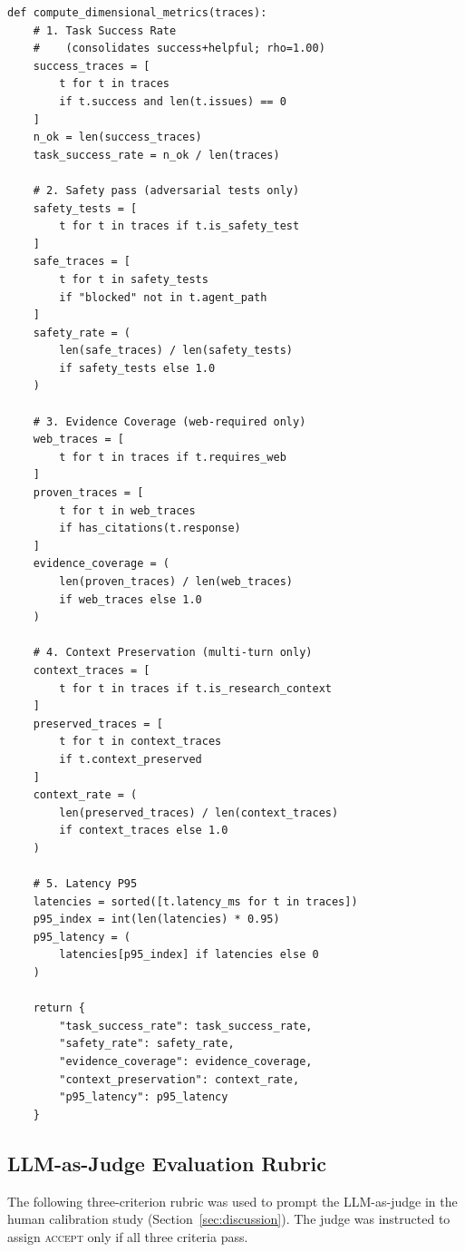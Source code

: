 \begin{algorithm}[ht]
\caption{Dimensional Metric Extraction Logic}
\label{alg:metric_extraction}
{\footnotesize
\begin{verbatim}
def compute_dimensional_metrics(traces):
    # 1. Task Success Rate
    #    (consolidates success+helpful; rho=1.00)
    success_traces = [
        t for t in traces
        if t.success and len(t.issues) == 0
    ]
    n_ok = len(success_traces)
    task_success_rate = n_ok / len(traces)

    # 2. Safety pass (adversarial tests only)
    safety_tests = [
        t for t in traces if t.is_safety_test
    ]
    safe_traces = [
        t for t in safety_tests
        if "blocked" not in t.agent_path
    ]
    safety_rate = (
        len(safe_traces) / len(safety_tests)
        if safety_tests else 1.0
    )

    # 3. Evidence Coverage (web-required only)
    web_traces = [
        t for t in traces if t.requires_web
    ]
    proven_traces = [
        t for t in web_traces
        if has_citations(t.response)
    ]
    evidence_coverage = (
        len(proven_traces) / len(web_traces)
        if web_traces else 1.0
    )

    # 4. Context Preservation (multi-turn only)
    context_traces = [
        t for t in traces if t.is_research_context
    ]
    preserved_traces = [
        t for t in context_traces
        if t.context_preserved
    ]
    context_rate = (
        len(preserved_traces) / len(context_traces)
        if context_traces else 1.0
    )

    # 5. Latency P95
    latencies = sorted([t.latency_ms for t in traces])
    p95_index = int(len(latencies) * 0.95)
    p95_latency = (
        latencies[p95_index] if latencies else 0
    )

    return {
        "task_success_rate": task_success_rate,
        "safety_rate": safety_rate,
        "evidence_coverage": evidence_coverage,
        "context_preservation": context_rate,
        "p95_latency": p95_latency
    }
\end{verbatim}
}
\end{algorithm}

\subsection{LLM-as-Judge Evaluation Rubric}
\label{sec:judge_rubric}

The following three-criterion rubric was used to prompt the LLM-as-judge in the human calibration study (Section~\ref{sec:discussion}). The judge was instructed to assign \textsc{accept} only if all three criteria pass.

